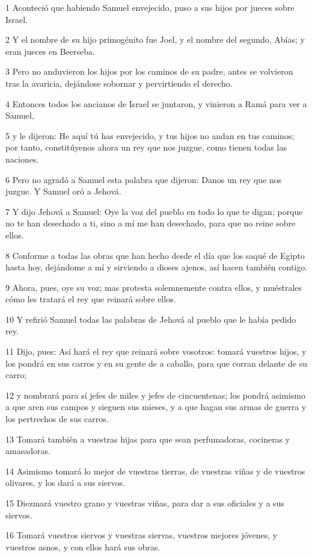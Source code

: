 \par 1 Aconteció que habiendo Samuel envejecido, puso a sus hijos por jueces sobre Israel.
\par 2 Y el nombre de su hijo primogénito fue Joel, y el nombre del segundo, Abías; y eran jueces en Beerseba.
\par 3 Pero no anduvieron los hijos por los caminos de su padre, antes se volvieron tras la avaricia, dejándose sobornar y pervirtiendo el derecho.
\par 4 Entonces todos los ancianos de Israel se juntaron, y vinieron a Ramá para ver a Samuel,
\par 5 y le dijeron: He aquí tú has envejecido, y tus hijos no andan en tus caminos; por tanto, constitúyenos ahora un rey que nos juzgue, como tienen todas las naciones. 
\par 6 Pero no agradó a Samuel esta palabra que dijeron: Danos un rey que nos juzgue. Y Samuel oró a Jehová.
\par 7 Y dijo Jehová a Samuel: Oye la voz del pueblo en todo lo que te digan; porque no te han desechado a ti, sino a mí me han desechado, para que no reine sobre ellos.
\par 8 Conforme a todas las obras que han hecho desde el día que los saqué de Egipto hasta hoy, dejándome a mí y sirviendo a dioses ajenos, así hacen también contigo.
\par 9 Ahora, pues, oye su voz; mas protesta solemnemente contra ellos, y muéstrales cómo les tratará el rey que reinará sobre ellos.
\par 10 Y refirió Samuel todas las palabras de Jehová al pueblo que le había pedido rey.
\par 11 Dijo, pues: Así hará el rey que reinará sobre vosotros: tomará vuestros hijos, y los pondrá en sus carros y en su gente de a caballo, para que corran delante de su carro;
\par 12 y nombrará para sí jefes de miles y jefes de cincuentenas; los pondrá asimismo a que aren sus campos y sieguen sus mieses, y a que hagan sus armas de guerra y los pertrechos de sus carros.
\par 13 Tomará también a vuestras hijas para que sean perfumadoras, cocineras y amasadoras.
\par 14 Asimismo tomará lo mejor de vuestras tierras, de vuestras viñas y de vuestros olivares, y los dará a sus siervos.
\par 15 Diezmará vuestro grano y vuestras viñas, para dar a sus oficiales y a sus siervos.
\par 16 Tomará vuestros siervos y vuestras siervas, vuestros mejores jóvenes, y vuestros asnos, y con ellos hará sus obras.
